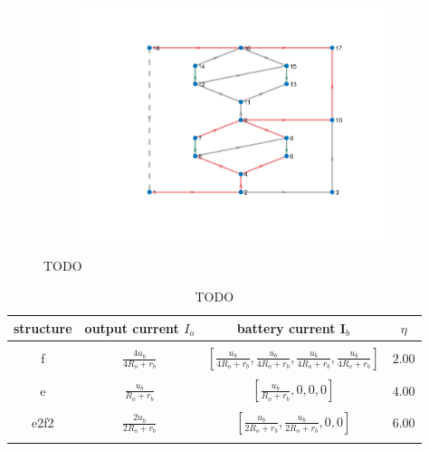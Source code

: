 \documentclass{article}
\begin{document}
\begin{figure}[htbp]
\begin{subfigure}[b]{0.3\textwidth}
    \caption{}
    \label{fig:e4-mac}
  \end{subfigure}
  \hspace{0.05\textwidth}
  \begin{subfigure}[b]{0.45\textwidth}
    \includegraphics[width=\textwidth]{../attachments/e2f2-dege-mac.png}
    \caption{}
    \label{fig:e2f2-mac}
  \end{subfigure}
    
  \caption{TODO}
  \label{fig:d-structure}
\end{figure}


\begin{table}[h]
    \caption{TODO}
    \label{tab:d-structure}
    \begin{tabular}{cccc}
        \hline
        structure &  output current $I_o$       & battery current $\bm{I}_b$       & $\eta$        \\ 
        \hline\\
        f &  $\displaystyle\frac{4u_b}{4R_o + r_b}$ &  $\displaystyle\left[\frac{u_b}{4R_o + r_b},\frac{u_b}{4R_o + r_b},\frac{u_b}{4R_o + r_b},\frac{u_b}{4R_o + r_b}\right]$   & $2.00$ \\ 
        \\
        e &  $\displaystyle\frac{u_b}{R_o + r_b}$ &  $\displaystyle\left[\frac{u_b}{R_o + r_b},0,0,0\right]$   & $4.00$ \\ 
        \\ 
        e2f2 &  $\displaystyle\frac{2u_b}{2R_o + r_b}$ &  $\displaystyle\left[\frac{u_b}{2R_o + r_b},\frac{u_b}{2R_o + r_b},0,0\right]$   & $6.00$ \\ 
        \\
        \hline
    \end{tabular}
\end{table}
\end{document}
